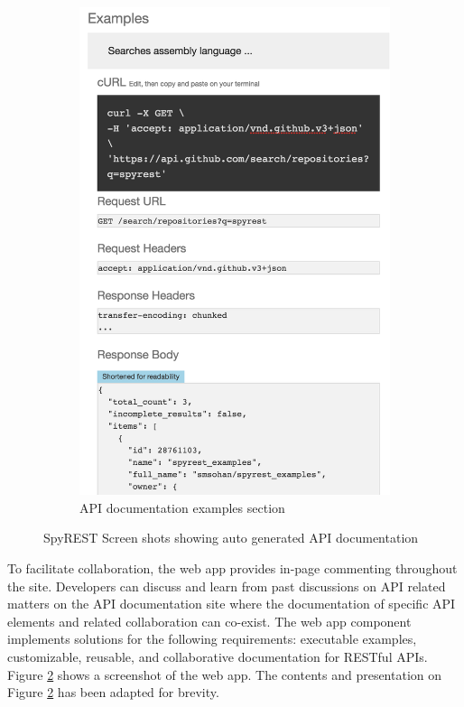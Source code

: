 \documentclass[11pt,oneside]{book}
\begin{document}
\begin{figure}[!tbh]
\begin{mdframed}
\begin{subfigure}[t]{0.45\textwidth}
      \includegraphics[width=\linewidth]{right.png}
      \caption{API documentation examples section}
      \label{fig:examples}
    \end{subfigure}
    \caption{SpyREST Screen shots showing auto generated API documentation}
    \label{fig:spyrest_screenshots}
  \end{mdframed}
\end{figure}


To facilitate collaboration, the web app provides in-page commenting throughout the site. Developers can discuss and learn from past discussions on API related matters on the API documentation site where the documentation of specific API elements and related collaboration can co-exist. The web app component implements solutions for the following requirements: executable examples, customizable, reusable, and collaborative documentation for RESTful APIs. Figure \ref{fig:spyrest_screenshots} shows a screenshot of the web app. The contents and presentation on Figure \ref{fig:spyrest_screenshots} has been adapted for brevity.
\end{document}
